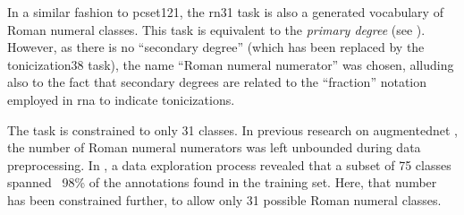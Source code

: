 
In a similar fashion to \gls{pcset121}, the \gls{rn31} task
is also a generated vocabulary of Roman numeral classes.
This task is equivalent to the \emph{primary degree} (see
). However, as there is no
``secondary degree'' (which has been replaced by the
\gls{tonicization38} task), the name ``Roman numeral
numerator'' was chosen, alluding also to the fact that
secondary degrees are related to the ``fraction'' notation
employed in \gls{rna} to indicate tonicizations.

The task is constrained to only 31 classes. In previous
research on \gls{augmentednet}
\parencite{napoleslopez2021augmentednet}, the number of
Roman numeral numerators was left unbounded during data
preprocessing. In \textcite{napoleslopez2021augmentednet}, a
data exploration process revealed that a subset of 75
classes spanned ~98\% of the annotations found in the
training set. Here, that number has been constrained
further, to allow only 31 possible Roman numeral classes.

